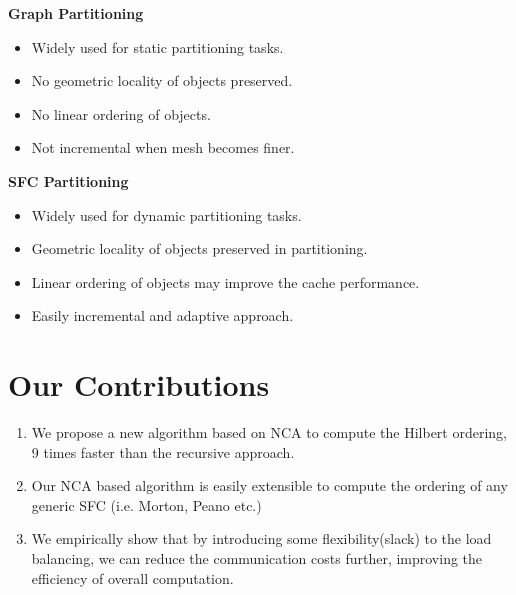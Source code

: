 \documentclass[a0,landscape]{a0poster}
\begin{document}
\begin{multicols}{4}
\color{black}
\begin{multicols}{2}
\textbf{Graph Partitioning}
\begin{itemize}
 \item Widely used for static partitioning tasks.
 \item No geometric locality of objects preserved.
 \item No linear ordering of objects.
 \item Not incremental when mesh becomes finer.
\end{itemize}
\columnbreak
\textbf{SFC Partitioning}
\begin{itemize}
 \item Widely used for dynamic partitioning tasks.
 \item Geometric locality of objects preserved in partitioning.
 \item Linear ordering of objects may improve the cache performance.
 \item Easily incremental and adaptive approach.
\end{itemize}
\end{multicols}







\color{ForestGreen}

\section*{Our Contributions}

\begin{enumerate}
\item We propose a new algorithm based on NCA to compute the Hilbert ordering, 9 times faster than the recursive approach.
\item Our NCA based algorithm is easily extensible to compute the ordering of any generic SFC (i.e. Morton, Peano etc.)
\item We empirically show that by introducing some flexibility(slack) to the load balancing, we can reduce the communication costs further, improving the efficiency of
overall computation. 
\end{enumerate}


\end{multicols}
\end{document}
